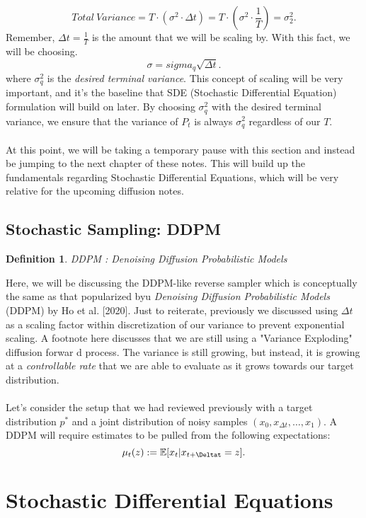 \documentclass[10pt, oneside]{report}
\newcommand{\E}{\mathbb{E}}
\newtheorem{defn}{Definition}
\begin{document}
\[
Total\ Variance = T \cdot (\sigma^2 \cdot \Delta t) = T \cdot (\sigma^2 \cdot \frac{1}{T}) = \sigma^2_2
.\] 
Remember, $\Delta t =  \frac{1}{T}$ is the amount that we will be scaling by.  With this fact, we will be choosing. \[
    \sigma = sigma_q\sqrt{\Delta t}
.\] where $\sigma^2_q$ is the \textit{desired terminal variance}.  This concept of  scaling will be very important, and it's the baseline that SDE (Stochastic Differential Equation) formulation will build on later. By choosing $\sigma^2_q$ with the desired terminal variance, we ensure that the variance of $P_t$ is always $\sigma^2_q$ regardless of our $T$.
\\
\\
At this point, we will be taking a temporary pause with this section and instead be jumping to the next chapter of these notes.  This will build up the fundamentals regarding Stochastic Differential Equations, which will be very relative for the upcoming diffusion notes. 

\section{Stochastic Sampling: DDPM}
\begin{defn}
    DDPM : Denoising Diffusion Probabilistic Models
\end{defn}

Here, we will be discussing the DDPM-like reverse sampler which is conceptually the same as that popularized byu \textit{Denoising Diffusion Probabilistic Models} (DDPM) by Ho et al. [2020].
Just to reiterate, previously we discussed using $\Delta t$ as a scaling factor within discretization of our variance to prevent exponential scaling.  A footnote here discusses that we are still using a "Variance Exploding" diffusion forwar d process.  The variance is still growing, but instead, it is growing at a \textit{controllable rate} that we are able to evaluate as it grows towards our target distribution. 
\\
\\
Let's consider the setup that we had reviewed previously with a target distribution $p^*$ and a joint distribution of noisy samples $(x_0, x_{\Delta t}, \ldots, x_1)$.  A DDPM will require estimates to be pulled from the following expectations:
\[
    \mu_t (z) : = \E[x_t | x_{t+\Deltat} = z]
.\] 



\chapter{Stochastic Differential Equations}
\end{document}
